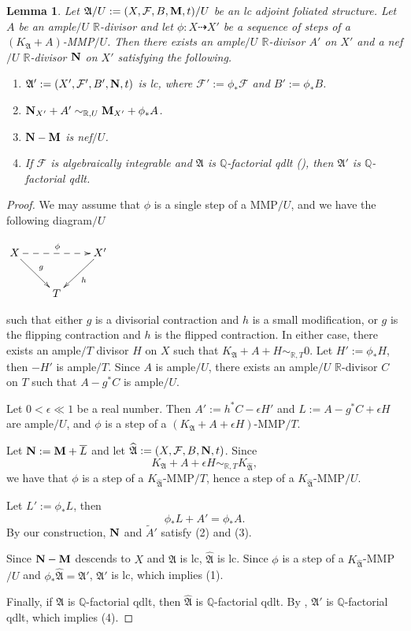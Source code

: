 \documentclass[12pt]{amsart}
\numberwithin{equation}{section}
\newcommand{\Mm}{{\bf{M}}}
\newcommand{\Nn}{{\bf{N}}}
\newcommand{\Qq}{\mathbb{Q}}
\newcommand{\Rr}{\mathbb{R}}
\newcommand{\Aa}{{\mathfrak{A}}}
\newcommand{\Ff}{\mathcal{F}}
\newtheorem{lem}[thm]{Lemma}
\theoremstyle{definition}
\theoremstyle{definition}
\theoremstyle{definition}
\begin{document}
\begin{lem}\label{lem: mmp preseves +a property}
    Let $\Aa/U:=(X,\Ff,B,\Mm,t)/U$ be an lc adjoint foliated structure. Let $A$ be an ample$/U$ $\Rr$-divisor and let $\phi: X\dashrightarrow X'$ be a sequence of steps of a $(K_{\Aa}+A)$-MMP$/U$. Then there exists an ample$/U$ $\Rr$-divisor $A'$ on $X'$ and a nef$/U$ $\Rr$-divisor $\Nn$ on $X'$ satisfying the following. 
    \begin{enumerate}
        \item $\Aa':=(X',\Ff',B',\Nn,t)$ is lc, where $\Ff':=\phi_*\Ff$ and $B':=\phi_*B$.
        \item $\Nn_{X'}+A'\sim_{\mathbb R,U}\Mm_{X'}+\phi_*A$.
        \item $\Nn-\Mm$ is nef$/U$.
        \item If $\Ff$ is algebraically integrable and $\Aa$ is $\mathbb Q$-factorial qdlt (\cite[Definition 3.1]{CHLMSSX24}), then $\Aa'$ is $\Qq$-factorial qdlt.
    \end{enumerate}
\end{lem}
\begin{proof}
    We may assume that $\phi$ is a single step of a MMP$/U$, and we have the following diagram$/U$
    \begin{center}$\xymatrix{
   X\ar@{->}[rd]^{g}\ar@{-->}[rr]^{\phi} & & X'\ar@{->}[dl]^{h}\\
    & T &
}$
\end{center}
such that either $g$ is a divisorial contraction and $h$ is a small modification, or $g$ is the flipping contraction and $h$ is the flipped contraction. In either case, there exists an ample$/T$ divisor $H$ on $X$ such that $K_{\Aa}+A+H\sim_{\mathbb R,T}0$. Let $H':=\phi_*H$, then $-H'$ is ample$/T$. Since $A$ is ample$/U$, there exists an ample$/U$ $\Rr$-divisor $C$ on $T$ such that $A-g^*C$ is ample$/U$. 

Let $0<\epsilon\ll 1$ be a real number. Then $A':=h^*C-\epsilon H'$ and $L:=A-g^*C+\epsilon H$ are ample$/U$, and $\phi$ is a step of a $(K_{\Aa}+A+\epsilon H)$-MMP$/T$. 

Let $\Nn:=\Mm+\overline{L}$ and let $\widehat{\Aa}:=(X,\Ff,B,\Nn,t)$. Since
$$K_{\Aa}+A+\epsilon H\sim_{\mathbb R,T}K_{\widehat{\Aa}},$$
we have that $\phi$ is a step of a $K_{\widehat{\Aa}}$-MMP$/T$, hence a step of a $K_{\widehat{\Aa}}$-MMP$/U$. 

Let $L':=\phi_*L$, then
$$\phi_*L+A'=\phi_*A.$$ 
By our construction, $\Nn$ and $\tilde A'$ satisfy (2) and (3). 

Since $\Nn-\Mm$ descends to $X$ and $\Aa$ is lc,  $\widehat{\Aa}$ is lc. Since $\phi$ is a step of a $K_{\widehat{\Aa}}$-MMP$/U$ and $\phi_*\widehat{\Aa}=\Aa'$, $\Aa'$ is lc, which implies (1). 

Finally, if $\Aa$ is $\mathbb Q$-factorial qdlt, then $\widehat{\Aa}$ is $\mathbb Q$-factorial qdlt. By \cite[Proposition 3.5]{CHLMSSX24}, $\Aa'$ is $\mathbb Q$-factorial qdlt, which implies (4).
\end{proof}
\end{document}
